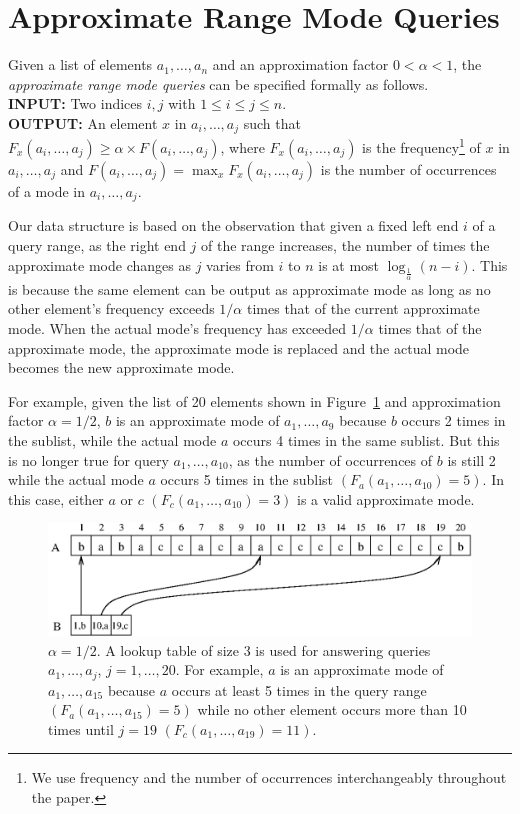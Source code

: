 \documentclass{llncs}
\begin{document}
\section{Approximate Range Mode Queries} 
Given a list of elements $a_1,\ldots,a_n$ and an approximation factor 
$0 < \alpha < 1$, the {\it  approximate range mode queries} can be specified 
formally as follows.\\
{\bf INPUT:} Two indices $i,j$ with $1 \leq i \leq j \leq n$.\\
{\bf OUTPUT:} An element $x$ in $a_i,\ldots,a_j$ such that 
$F_{x}(a_i,\ldots,a_j) \ge \alpha \times F(a_i,\ldots,a_j)$, where 
$F_{x}(a_i,\ldots,a_j)$ is the frequency\footnote{We use frequency 
and the number of
occurrences interchangeably throughout the paper.} of $x$ in 
$a_i,\ldots,a_j$ and $F{(a_i,\ldots,a_j)} =
\max_x{F_{x}(a_i,\ldots,a_j)}$ 
is the number of occurrences of a mode in $a_i,\ldots,a_j$.


Our data structure is based on the observation that given a fixed left end $i$ of a
query range, as the right end $j$ of the range increases, the number of times the
approximate mode changes as  $j$ varies 
from $i$ to $n$ is at most $\log_{\frac{1}{\alpha}} (n-i)$. 
This is because the same element can be output as approximate 
mode as long as no other element's
frequency exceeds $1/\alpha$ times that of the current approximate mode.
When the actual mode's frequency has exceeded $1/\alpha$ times that of the 
approximate mode, the approximate mode is replaced and the
actual mode becomes the new approximate mode.

For example, given the list of 20 elements shown in 
Figure~\ref{originalarray} and 
approximation factor $\alpha = 1/2$, $b$ is an approximate 
mode of $a_1,\ldots,a_{9}$ 
because $b$ occurs 2 times in the sublist, while 
the actual mode $a$ occurs 4 times in the same sublist. 
But this is no longer true for query $a_1,\ldots,a_{10}$, 
as the number of occurrences of $b$ is
still 2 while the actual mode $a$ occurs 5 times in the sublist
$(F_{a}(a_1,\ldots,a_{10})=5)$.  
In this case, either $a$ or $c$ $(F_{c}(a_1,\ldots,a_{10})=3)$ is a valid approximate mode. 

\begin{figure}[htb]\label{originalarray}
\centering
\includegraphics[width=4.8in]{oa}
\caption{$\alpha=1/2$. A lookup table of size 3 is used for answering queries
  $a_1,\ldots,a_j$, $j=1,\ldots,20.$ For example, $a$ is an approximate mode of
  $a_1,\ldots,a_{15}$ because $a$ occurs at
  least 5 times in the query range $(F_a(a_1,\ldots,a_{15})=5 )$
while no other element occurs more than 10 times until $j=19$ $(F_c(a_1,\ldots,a_{19})=11)$.} 
\label{originalarray}
\end{figure}
\end{document}
